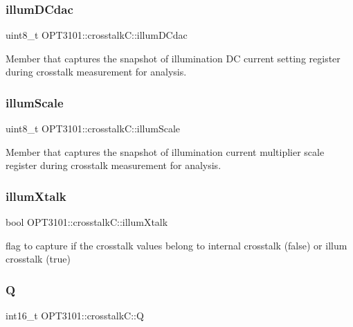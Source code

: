 \subsubsection{\texorpdfstring{illum\+D\+Cdac}{illumDCdac}}
{\footnotesize\ttfamily uint8\+\_\+t O\+P\+T3101\+::crosstalk\+C\+::illum\+D\+Cdac}



Member that captures the snapshot of illumination DC current setting register during crosstalk measurement for analysis. 

\mbox{\label{class_o_p_t3101_1_1crosstalk_c_aa9790b90a4d30f9459ef30c2ffcb0f15}} 
\subsubsection{\texorpdfstring{illum\+Scale}{illumScale}}
{\footnotesize\ttfamily uint8\+\_\+t O\+P\+T3101\+::crosstalk\+C\+::illum\+Scale}



Member that captures the snapshot of illumination current multiplier scale register during crosstalk measurement for analysis. 

\mbox{\label{class_o_p_t3101_1_1crosstalk_c_a74d3bfbfb7da65511d2d16e1b66a7098}} 
\subsubsection{\texorpdfstring{illum\+Xtalk}{illumXtalk}}
{\footnotesize\ttfamily bool O\+P\+T3101\+::crosstalk\+C\+::illum\+Xtalk}



flag to capture if the crosstalk values belong to internal crosstalk (false) or illum crosstalk (true) 

\mbox{\label{class_o_p_t3101_1_1crosstalk_c_a1e20d913baf2432ec90fe06a45c226db}} 
\subsubsection{\texorpdfstring{Q}{Q}}
{\footnotesize\ttfamily int16\+\_\+t O\+P\+T3101\+::crosstalk\+C\+::Q}



